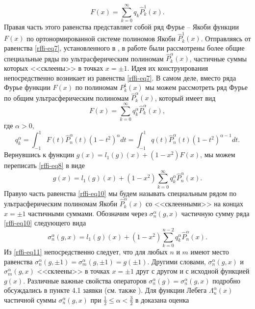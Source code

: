 \begin{equation}\label{rffi-eq7}
F(x)=\sum_{k=0}^\infty q_k\hat P_k^1(x).
\end{equation}
Правая часть этого равенства представляет собой ряд Фурье -- Якоби функции $F(x)$ по ортонормированной системе полиномов Якоби
$\hat P_k^1(x)$. Отправляясь от равенства \eqref{rffi-eq7}, установленного в \cite{rffi-13}, в работе \cite{rffi-14} были рассмотрены более общие специальные ряды  по ультрасферическим полиномам $\hat P_k^\alpha(x)$, частичные суммы которых <<склеены>> в точках $x=\pm1$.
Идея их конструирования непосредственно возникает из равенства \eqref{rffi-eq7}. В самом деле, вместо ряда Фурье функции $F(x)$ по полиномам  $P_k^1(x)$ мы можем рассмотреть  ряд Фурье по общим ультрасферическим полиномам $\hat P_k^\alpha(x)$, который имеет вид
\begin{equation}\label{rffi-eq8}
F(x)=\sum_{k=0}^\infty q_k^\alpha\hat P_k^\alpha(x),
\end{equation}
где $\alpha>0$,
\begin{equation}\label{rffi-eq9}
q_k^\alpha=\int_{-1}^1 F(t)\hat P_n^\alpha(t)(1-t^2)^\alpha dt=\int_{-1}^1 q(t)\hat P_n^\alpha(t)(1-t^2)^{\alpha-1} dt.
\end{equation}
Вернувшись к функции $g(x)=l_1(g)(x)+(1-x^2)F(x)$, мы можем переписать \eqref{rffi-eq8} в виде
\begin{equation}\label{rffi-eq10}
g(x)= l_1(g)(x)+(1-x^2)\sum_{k=0}^\infty q_k^\alpha\hat P_n^{\alpha}(x).
\end{equation}
Правую часть равенства \eqref{rffi-eq10} мы будем называть специальным рядом по ультрасферическим полиномам Якоби  $\hat P_k^\alpha(x)$ со  <<склеенными>> на концах $x=\pm1$ частичными суммами. Обозначим через $\sigma_n^\alpha(g,x)$ частичную сумму ряда \eqref{rffi-eq10} следующего вида
\begin{equation}\label{rffi-eq11}
\sigma_n^\alpha(g,x)=l_1(g)(x)+(1-x^2)\sum_{k=0}^{n-2} q_k^\alpha\hat P_n^{\alpha}(x).
\end{equation}
Из \eqref{rffi-eq11} непосредственно следует, что для любых $n$ и $m$ имеют место равенства $\sigma_n^\alpha(g,\pm1)=\sigma_m^\alpha(g,\pm1)=g(\pm1)$. Другими словами, $\sigma_n^\alpha(g,x)$ и $\sigma_m^\alpha(g,x)$
<<склеены>> в точках    $x=\pm1$ друг с другом и с исходной функцией $g(x)$. Различные важные свойства операторов $\sigma_n^\alpha(g)=\sigma_n^\alpha(g,x)$ подробно обсуждались в пункте 4.1 заявки (см. также \cite{rffi-14}). Для функции Лебега $\Lambda_n^\alpha(x)$ частичной суммы $\sigma_n^\alpha(g,x)$ при $\frac12\le \alpha<\frac32$ в \cite{rffi-14} доказана оценка
